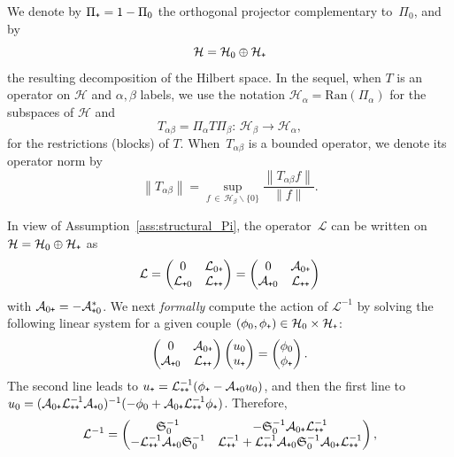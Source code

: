 \documentclass[10pt]{amsart}
\theoremstyle{definition}\newtheorem{defi}[theo]{Definition}\newtheorem{rema}[theo]{Remark}\newtheorem{exam}[theo]{Example}\newtheorem{exem}[theo]{Example}\newtheorem{nota}[theo]{Notation}
\newcommand{\Ran}{\mathrm{Ran}}
\newcommand{\cL}{\mathcal{L}}
\newcommand{\cLa}{\mathcal{A}}
\newcommand{\cH}{\mathcal{H}}
\newcommand{\Schur}{\mathfrak{S}_0}
\newcommand{\subplus}{\textnormal{\texttt{+}}}
\begin{document}
We denote by $\Pi_{\subplus} = 1 - \Pi_{0}$ the orthogonal projector complementary to~$\Pi_{0}$, and by
\[
\cH = \cH_0 \oplus \cH_\subplus
\]
the resulting decomposition of the Hilbert space. In the sequel, when $T$ is an operator on $\cH$ and $\alpha,\beta$ labels, we use the notation $\cH_\alpha = {\Ran}(\Pi_\alpha)$ for the subspaces of $\cH$ and
\[
T_{\alpha\beta} = \Pi_{\alpha} T \Pi_{\beta}:\, \cH_{\beta} \to \cH_{\alpha},
\]
for the restrictions (blocks) of $T$. When~$T_{\alpha\beta}$ is a bounded operator, we denote its operator norm by
\[
\left\|T_{\alpha\beta}\right\| = \sup_{f\,\in\,\cH_\beta \backslash \{0\}} \frac{\left\|T_{\alpha\beta}f\right\|}{\|f\|}.
\]

In view of Assumption~\ref{ass:structural_Pi}, the operator~$\cL$ can be written on $\cH = \cH_{0} \oplus \cH_{\subplus}$ as
\begin{equation}\label{eq:saddle_point_like}
\cL =
\begin{pmatrix}
0 & \cL_{0\subplus}\\
\cL_{\subplus0} & \cL_{\subplus\subplus}
\end{pmatrix} =
\begin{pmatrix}
0 & \cLa_{0\subplus}\\
\cLa_{\subplus0} & \cL_{\subplus\subplus}
\end{pmatrix}
\end{equation}
with $\cLa_{0\subplus} = -\cLa_{\subplus0}^{*}$. We next \emph{formally} compute the action of $\cL^{-1}$ by solving the following linear system for a given couple $(\phi_{0},\phi_{\subplus}) \in \cH_0 \times \cH_\subplus$:
\[
\begin{pmatrix} 0 & \cLa_{0\subplus}\\
\cLa_{\subplus0} & \cL_{\subplus\subplus}
\end{pmatrix}
\begin{pmatrix} u_{0} \\ u_{\subplus}
\end{pmatrix} =
\begin{pmatrix} \phi_{0} \\ \phi_{\subplus}
\end{pmatrix}.
\]
The second line leads to $u_{\subplus} = \cL_{\subplus\subplus}^{-1}(\phi_{\subplus} - \cLa_{\subplus0} u_{0})$, and then the first line to $u_{0} = (\cLa_{0\subplus} \cL_{\subplus\subplus}^{-1} \cLa_{\subplus0})^{-1}(-\phi_{0} + \cLa_{0\subplus} \cL_{\subplus\subplus}^{-1} \phi_{\subplus})$. Therefore,
\begin{equation}\label{eq:formal_action_resolvent}
\cL^{-1} =
\begin{pmatrix}
\Schur^{-1} & -\Schur^{-1} \cLa_{0\subplus} \cL_{\subplus\subplus}^{-1}\\
-\cL_{\subplus\subplus}^{-1} \cLa_{\subplus0} \Schur^{-1} & \cL_{\subplus\subplus}^{-1} + \cL_{\subplus\subplus}^{-1} \cLa_{\subplus0} \Schur^{-1} \cLa_{0\subplus} \cL_{\subplus\subplus}^{-1}
\end{pmatrix},
\end{equation}
\end{document}
